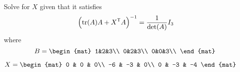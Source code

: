 
\begin{Exercise}[
name={},
title={}, 
difficulty=0,
origin={\cite{YL}}]
Solve for $X$ given that it satisfies
\[
\Big(\text{tr}(A)A+{{X}^{\mathsf{T}}}A\Big)^{-1}=\frac{1}{\det(A)}I_3
\]
where
\[
B=
\begin{mat}
1&2&3\\
0&2&3\\
0&0&3\\
\end{mat}\;
\]

\end{Exercise}

\begin{Answer}
$
X=
\begin{mat}
0 & 0 & 0\\
-6 & -3 & 0\\
0 & -3 & -4
\end{mat}
$
\end{Answer}
